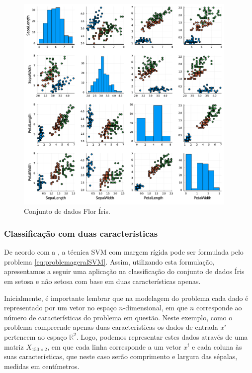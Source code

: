 \documentclass[12pt,a4paper]{scrartcl}
\def\RR{\mathds{R}}
\theoremstyle{definition}%
\newcommand{\prompt}[4]{
        \ttfamily\llap{{\color{#2}[#3]:\hspace{3pt}#4}}\vspace{-\baselineskip}
    }
\begin{document}
    
    \begin{center} 
    \begin{figure}
    \includegraphics[width=0.95\textwidth]{Implementacao_de_SVM_em_Julia_TCC_files/Implementacao_de_SVM_em_Julia_TCC_6_0.pdf} 
    \caption{Conjunto de dados Flor Íris.} \label{fig:pairplot_dados_iris}
    \end{figure}
    \end{center}
    

\hypertarget{classificauxe7uxe3o-com-duas-caracteruxedsticas}{%
\subsubsection{Classificação com duas
características}\label{classificauxe7uxe3o-com-duas-caracteruxedsticas}}

De acordo com a , a técnica SVM com margem rígida pode ser
formulada pelo problema \eqref{eq:problemageralSVM}. Assim, utilizando esta formulação, apresentamos a seguir uma aplicação na classificação do conjunto de dados Íris em setosa e não setosa com base em duas características apenas.

Inicialmente, é importante lembrar que na modelagem do problema cada
dado é representado por um vetor no espaço $n$-dimensional, em que $n$
corresponde ao número de características do problema em questão. Neste
exemplo, como o problema compreende apenas duas características os dados
de entrada $x^{i}$ pertencem ao espaço $\RR^{2}$. Logo,
podemos representar estes dados através de uma matriz
$X_{150\times 2}$, em que cada linha corresponde a um vetor $x^{i}$
e cada coluna às suas características, que neste caso serão comprimento
e largura das sépalas, medidas em centímetros.
\end{document}
